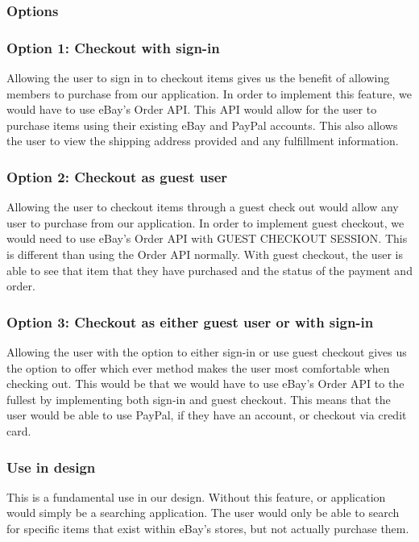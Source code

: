 \documentclass[journal,compsoc, 10pt, draftclsnofoot, onecolumn]{IEEEtran}
\begin{document}
\subsubsection{Options}
\subsubsection*{Option 1: Checkout with sign-in}
Allowing the user to sign in to checkout items gives us the benefit of allowing
members to purchase from our application. In order to implement this feature, we 
would have to use eBay's Order API. This API would allow for the user to
purchase items using their existing eBay and PayPal accounts. This also allows
the user to view the shipping address provided and any fulfillment information.

\subsubsection*{Option 2: Checkout as guest user}
Allowing the user to checkout items through a guest check out would allow any
user to purchase from our application. In order to implement guest checkout, we
would need to use eBay's Order API with GUEST CHECKOUT SESSION. This is
different than using the Order API normally. With guest checkout, the user is
able to see that item that they have purchased and the status of the payment and
 order.

\subsubsection*{Option 3: Checkout as either guest user or with sign-in}
Allowing the user with the option to either sign-in or use guest checkout gives
us the option to offer which ever method makes the user most comfortable when
checking out. This would be that we would have to use eBay's Order API to the
fullest by implementing both sign-in and guest checkout. This means that the
user would be able to use PayPal, if they have an account, or checkout via
credit card.

\subsubsection{Use in design}
This is a fundamental use in our design. Without this feature, or application
would simply be a searching application. The user would only be able to search
for specific items that exist within eBay's stores, but not actually purchase
them.
\end{document}
